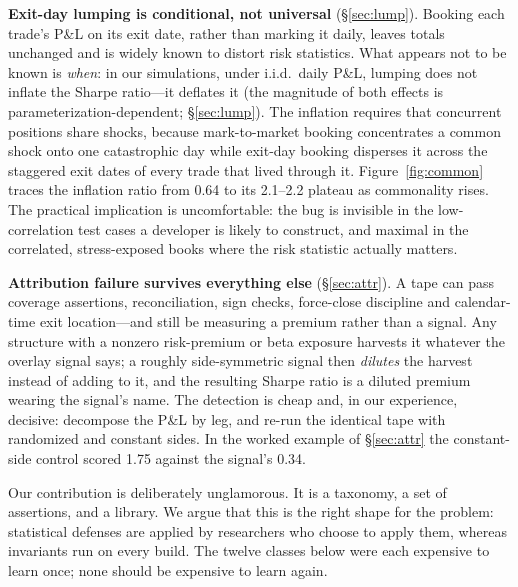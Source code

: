 \documentclass[11pt]{article}
\begin{document}
\textbf{Exit-day lumping is conditional, not universal} (\S\ref{sec:lump}). Booking each
trade's P\&L on its exit date, rather than marking it daily, leaves totals unchanged and is
widely known to distort risk statistics. What appears not to be known is \emph{when}: in our
simulations, under i.i.d.\ daily P\&L, lumping does not inflate the Sharpe ratio---it deflates
it (the magnitude of both effects is parameterization-dependent; \S\ref{sec:lump}). The
inflation requires that concurrent positions share shocks, because mark-to-market booking
concentrates a common shock onto one catastrophic day while exit-day booking disperses it
across the staggered exit dates of every trade that lived through it. Figure~\ref{fig:common}
traces the inflation ratio from 0.64 to its 2.1--2.2 plateau as commonality rises. The practical implication
is uncomfortable: the bug is invisible in the low-correlation test cases a developer is likely
to construct, and maximal in the correlated, stress-exposed books where the risk statistic
actually matters.

\textbf{Attribution failure survives everything else} (\S\ref{sec:attr}). A tape can pass
coverage assertions, reconciliation, sign checks, force-close discipline and calendar-time exit
location---and still be measuring a premium rather than a signal. Any structure with a nonzero
risk-premium or beta exposure harvests it whatever the overlay signal says; a roughly
side-symmetric signal then \emph{dilutes} the harvest instead of adding to it, and the
resulting Sharpe ratio is a diluted premium wearing the signal's name. The detection is cheap
and, in our experience, decisive: decompose the P\&L by leg, and re-run the identical tape with
randomized and constant sides. In the worked example of \S\ref{sec:attr} the constant-side
control scored 1.75 against the signal's 0.34.

Our contribution is deliberately unglamorous. It is a taxonomy, a set of assertions, and a
library. We argue that this is the right shape for the problem: statistical defenses are
applied by researchers who choose to apply them, whereas invariants run on every build. The
twelve classes below were each expensive to learn once; none should be expensive to learn
again.
\end{document}
